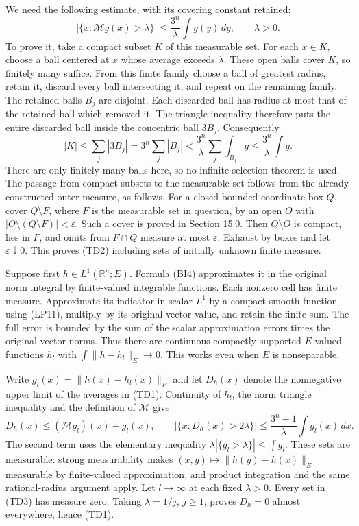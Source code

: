 \documentclass[
  11pt,
]{article}
\begin{document}
We need the following estimate, with its covering constant retained: \[
 |\{x:\mathcal Mg(x)>\lambda\}|
       \leq\frac{3^n}{\lambda}\int g(y)\,dy,
                         \qquad \lambda>0.                 \tag{TD2}
\] To prove it, take a compact subset \(K\) of this measurable set. For
each \(x\in K\), choose a ball centered at \(x\) whose average exceeds
\(\lambda\). These open balls cover \(K\), so finitely many suffice.
From this finite family choose a ball of greatest radius, retain it,
discard every ball intersecting it, and repeat on the remaining family.
The retained balls \(B_j\) are disjoint. Each discarded ball has radius
at most that of the retained ball which removed it. The triangle
inequality therefore puts the entire discarded ball inside the
concentric ball \(3B_j\). Consequently \[
 |K|\leq\sum_j|3B_j|=3^n\sum_j|B_j|
       <\frac{3^n}{\lambda}\sum_j\int_{B_j}g
       \leq\frac{3^n}{\lambda}\int g.
\] There are only finitely many balls here, so no infinite selection
theorem is used. The passage from compact subsets to the measurable set
follows from the already constructed outer measure, as follows. For a
closed bounded coordinate box \(Q\), cover \(Q\setminus F\), where \(F\)
is the measurable set in question, by an open \(O\) with
\(|O\setminus(Q\setminus F)|<\varepsilon\). Such a cover is proved in
Section 15.0. Then \(Q\setminus O\) is compact, lies in \(F\), and omits
from \(F\cap Q\) measure at most \(\varepsilon\). Exhaust by boxes and
let \(\varepsilon\downarrow0\). This proves (TD2) including sets of
initially unknown finite measure.

Suppose first \(h\in L^1(\mathbb R^n;E)\). Formula (BI4) approximates it
in the original norm integral by finite-valued integrable functions.
Each nonzero cell has finite measure. Approximate its indicator in
scalar \(L^1\) by a compact smooth function using (LP11), multiply by
its original vector value, and retain the finite sum. The full error is
bounded by the sum of the scalar approximation errors times the original
vector norms. Thus there are continuous compactly supported \(E\)-valued
functions \(h_l\) with \(\int\|h-h_l\|_E\to0\). This works even when
\(E\) is nonseparable.

Write \(g_l(x)=\|h(x)-h_l(x)\|_E\) and let \(D_h(x)\) denote the
nonnegative upper limit of the averages in (TD1). Continuity of \(h_l\),
the norm triangle inequality and the definition of \(\mathcal M\) give
\[
 D_h(x)\leq (\mathcal Mg_l)(x)+g_l(x),\qquad
 |\{x:D_h(x)>2\lambda\}|
       \leq\frac{3^n+1}{\lambda}\int g_l(x)\,dx.             \tag{TD3}
\] The second term uses the elementary inequality
\(\lambda|\{g_l>\lambda\}|\leq\int g_l\). These sets are measurable:
strong measurability makes \((x,y)\mapsto\|h(y)-h(x)\|_E\) measurable by
finite-valued approximation, and product integration and the same
rational-radius argument apply. Let \(l\to\infty\) at each fixed
\(\lambda>0\). Every set in (TD3) has measure zero. Taking
\(\lambda=1/j\), \(j\geq1\), proves \(D_h=0\) almost everywhere, hence
(TD1).
\end{document}
